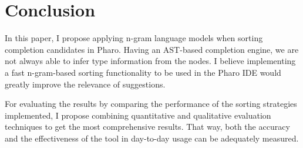 \documentclass[sigconf,screen]{acmart}
\begin{document}
\section{Conclusion}
In this paper, I propose applying n-gram language models when sorting completion candidates in Pharo. Having an AST-based completion engine, we are not always able to infer type information from the nodes. I believe implementing a fast n-gram-based sorting functionality to be used in the Pharo IDE would greatly improve the relevance of suggestions.

For evaluating the results by comparing the performance of the sorting strategies implemented, I propose combining quantitative and qualitative evaluation techniques to get the most comprehensive results. That way, both the accuracy and the effectiveness of the tool in day-to-day usage can be adequately measured.



\end{document}
